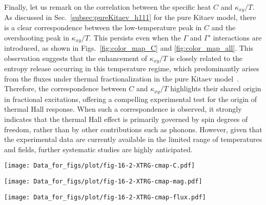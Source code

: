 \documentclass[twocolumn,superscriptaddress,showpacs, longbibliography, aps, prx]{revtex4-2}
\begin{document}
Finally, let us remark on the correlation between the specific heat $C$ and $\kappa_{xy}/T$. 
As discussed in Sec.~\ref{subsec:pureKitaev_h111} for the pure Kitaev model, there is a clear correspondence between the low-temperature peak in $C$ and the overshooting peak in $\kappa_{xy}/T$. 
This persists even when the $\Gamma$ and $\Gamma'$ interactions are introduced, as shown in Figs.~\ref{fig:color_map_C} and \ref{fig:color_map_all}. 
This observation suggests that the enhancement of $\kappa_{xy}/T$ is closely related to the entropy release occurring in this temperature regime, which predominantly arises from the fluxes under thermal fractionalization in the pure Kitaev model~\cite{NasuUM2015}. 
Therefore, the correspondence between $C$ and $\kappa_{xy}/T$ highlights their shared origin in fractional excitations, offering a compelling experimental test for the origin of thermal Hall response. 
When such a correspondence is observed, it strongly indicates that the thermal Hall effect is primarily governed by spin degrees of freedom, rather than by other contributions such as phonons. 
However, given that the experimental data are currently available in the limited range of temperatures and fields, further systematic studies are highly anticipated. 

\begin{figure*}[htb]
  \begin{center}
    \texttt{[image: Data\_for\_figs/plot/fig-16-2-XTRG-cmap-C.pdf]}
  \end{center}
  \caption{
Color maps of the specific heat for the pure Kitaev model on the field-temperature plane with (a)-(e) $\Gamma=0$ and varying $\Gamma'$ and  (f)-(i) varying $\Gamma$ and $\Gamma'=0$.}
  \label{fig:color_map_C}
\end{figure*}

\begin{figure*}[htb]
  \begin{center}
    \texttt{[image: Data\_for\_figs/plot/fig-16-2-XTRG-cmap-mag.pdf]}
  \end{center}
  \caption{
Color maps of the magnetization, corresponding to Fig.~\ref{fig:color_map_C}.} 
  \label{fig:color_map_mag}
\end{figure*}

\begin{figure*}[htb]
  \begin{center}
    \texttt{[image: Data\_for\_figs/plot/fig-16-2-XTRG-cmap-flux.pdf]}
  \end{center}
  \caption{
Color maps of the flux density, corresponding to Fig.~\ref{fig:color_map_C}.} 
  \label{fig:color_map_flux}
\end{figure*}
\end{document}

